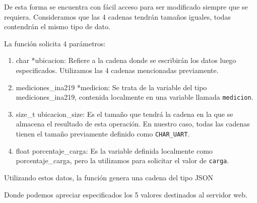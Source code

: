 \begin{itemize} [label = ·]
                        De esta forma se encuentra con fácil acceso para ser modificado siempre que se requiera. Consideramos que las 4 cadenas tendrán tamaños iguales, todas contendrán el mismo tipo de dato.\par
                        La función solicita 4 parámetros:\par
                        \begin{enumerate}
                            \item char *ubicacion: Refiere a la cadena donde se escribirán los datos luego especificados. Utilizamos las 4 cadenas mencionadas previamente.\par
                            \item mediciones\_ina219 *medicion: Se trata de la variable del tipo mediciones\_ina219, contenida localmente en una variable llamada \texttt{medicion}.\par
                            \item size\_t ubicacion\_size: Es el tamaño que tendrá la cadena en la que se almacena el resultado de esta operación. En nuestro caso, todas las cadenas tienen el tamaño previamente definido como \texttt{CHAR\_UART}.\par
                            \item float porcentaje\_carga: Es la variable definida localmente como porcentaje\_carga, pero la utilizamos para solicitar el valor de \texttt{carga}.
                            
                        \end{enumerate}
                        
                        	Utilizando estos datos, la función genera una cadena del tipo JSON\par
                         
                        	\par
                          
                        	Donde podemos apreciar especificados los 5 valores destinados al servidor web.\par
                         
                \end{itemize}

